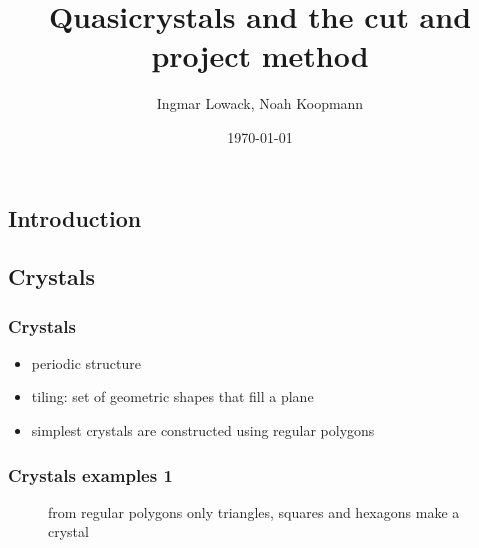 \documentclass[]{beamer}
\title{Quasicrystals and the cut and project method}
\author{Ingmar Lowack, Noah Koopmann}
\date{\today}
\institute{Heidelberg Experimental Geometry Lab}
\begin{document}
  
\begin{frame}
  \titlepage
\end{frame}
\begin{frame}
  \tableofcontents
\end{frame}

\begin{frame}
  \section{Introduction}
  \subsection{Crystals}
  \frametitle{Crystals}
  \begin{itemize}
    \item periodic structure
    \item tiling: set of geometric shapes that fill a plane
    \item simplest crystals are constructed using regular polygons
  \end{itemize}
\end{frame}
\begin{frame}
  \frametitle{Crystals examples 1}
  \begin{figure}
    \centering
    \setlength{\fboxsep}{0pt}%
\setlength{\fboxrule}{1pt}%
        \caption{from regular polygons only triangles, squares and hexagons make a crystal}
        \label{fig:periodicTilings}
    \end{figure}
\end{frame}
\end{document}
